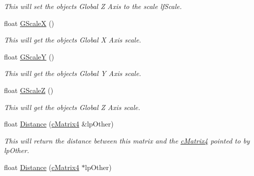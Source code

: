 \begin{DoxyCompactItemize}
\begin{DoxyCompactList}\small\item\em This will set the objects Global Z Axis to the scale lfScale. \end{DoxyCompactList}\item 
\hypertarget{classc_matrix4_a74c4a8cd7539f99ba2d5c8c98f757748}{
float \hyperlink{classc_matrix4_a74c4a8cd7539f99ba2d5c8c98f757748}{GScaleX} ()}
\label{classc_matrix4_a74c4a8cd7539f99ba2d5c8c98f757748}

\begin{DoxyCompactList}\small\item\em This will get the objects Global X Axis scale. \end{DoxyCompactList}\item 
\hypertarget{classc_matrix4_aa9493e86b746ba33d0135d4adcf74b3e}{
float \hyperlink{classc_matrix4_aa9493e86b746ba33d0135d4adcf74b3e}{GScaleY} ()}
\label{classc_matrix4_aa9493e86b746ba33d0135d4adcf74b3e}

\begin{DoxyCompactList}\small\item\em This will get the objects Global Y Axis scale. \end{DoxyCompactList}\item 
\hypertarget{classc_matrix4_af5ad4a4ea96eb13c9c12b6edfa1f96c2}{
float \hyperlink{classc_matrix4_af5ad4a4ea96eb13c9c12b6edfa1f96c2}{GScaleZ} ()}
\label{classc_matrix4_af5ad4a4ea96eb13c9c12b6edfa1f96c2}

\begin{DoxyCompactList}\small\item\em This will get the objects Global Z Axis scale. \end{DoxyCompactList}\item 
\hypertarget{classc_matrix4_ae9eae21b1f949a96b77968b7d4d68306}{
float \hyperlink{classc_matrix4_ae9eae21b1f949a96b77968b7d4d68306}{Distance} (\hyperlink{classc_matrix4}{cMatrix4} \&lpOther)}
\label{classc_matrix4_ae9eae21b1f949a96b77968b7d4d68306}

\begin{DoxyCompactList}\small\item\em This will return the distance between this matrix and the \hyperlink{classc_matrix4}{cMatrix4} pointed to by lpOther. \end{DoxyCompactList}\item 
\hypertarget{classc_matrix4_acd04bb06d1d12807b203b0aaf9e9b608}{
float \hyperlink{classc_matrix4_acd04bb06d1d12807b203b0aaf9e9b608}{Distance} (\hyperlink{classc_matrix4}{cMatrix4} $\ast$lpOther)}
\label{classc_matrix4_acd04bb06d1d12807b203b0aaf9e9b608}


\end{DoxyCompactItemize}
